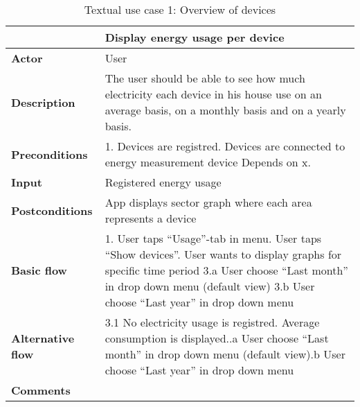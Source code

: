 \begin{table}[H]
\begin{tabular}{|l|p{12cm}|}
\hline
&\textbf{Display energy usage per device}\\\hline
\textbf{Actor} &User\\\hline
\textbf{Description}&
The user should be able to see how much electricity each device in his house use on an average basis, on a monthly basis and on a yearly basis.\\\hline
\textbf{Preconditions}&
1. Devices are registred\newline
2. Devices are connected to energy measurement device\newline
Depends on x.\\\hline
\textbf{Input}&
Registered energy usage\\\hline
\textbf{Postconditions}& App displays sector graph where each area represents a device\\\hline
\textbf{Basic flow}&
1. User taps “Usage”-tab in menu\newline
2. User taps “Show devices”\newline
3. User wants to display graphs for specific time period\newline
3.a User choose “Last month” in drop down menu (default view)\newline
3.b User choose “Last year” in drop down menu\\\hline
\textbf{Alternative flow}&
3.1 No electricity usage is registred. Average consumption is displayed.\newline
3.1.a User choose “Last month” in drop down menu (default view)\newline
3.1.b User choose “Last year” in drop down menu\\\hline
\textbf{Comments}&\\\hline
\end{tabular}
\caption{Textual use case 1: Overview of devices}
\end{table}

